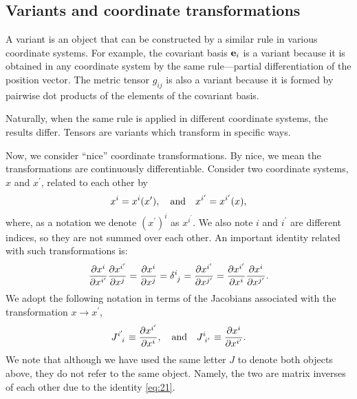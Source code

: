 \documentclass{article}
\begin{document}
	\subsection{Variants and coordinate transformations}
	A variant is an object that can be constructed by a similar rule in various coordinate systems. For example, the covariant basis $ \vb{e}_{i} $ is a variant because it is obtained in any coordinate system by the same rule—partial differentiation of the position vector. The metric tensor $ g_{ij} $ is also a variant because it is formed by pairwise dot products of the elements of the covariant basis.
	\par
	Naturally, when the same rule is applied in different coordinate systems, the results differ. Tensors are variants which transform in specific ways.
	\par
	Now, we consider ``nice'' coordinate transformations. By nice, we mean the transformations are continuously differentiable. Consider two coordinate systems, $ x $ and $ x^\prime $, related to each other by
	\[
	x^{i} = x^{i}(x^\prime), \qq{and} x^{i^\prime}= x^{i^\prime}(x),
	\]
	where, as a notation we denote $ (x^\prime)^{i} $ as $ x^{i^\prime} $. We also note $ i $ and $ i^\prime $ are different indices, so they are not summed over each other. An important identity related with such transformations is:
	\begin{equation} \label{eq:21}
	\pdv{x^{i}}{x^{i^\prime}}\pdv{x^{i^\prime}}{x^{j}} = \pdv{x^{i}}{x^{j}} = \delta\indices{^{i}_{j}} = \pdv{x^{i^\prime}}{x^{j^\prime}} = \pdv{x^{i^\prime}}{x^{i}}\pdv{x^{i}}{x^{j^\prime}}.
	\end{equation}
	We adopt the following notation in terms of the Jacobians associated with the transformation $ x \to x^\prime $,
	\begin{equation}
	J\indices{^{i^\prime}_{i}} \equiv \pdv{x^{i^\prime}}{x^{i}}, \qq{and} J\indices{^{i}_{i^\prime}} \equiv \pdv{x^{i}}{x^{i^\prime}}.
	\end{equation}
	We note that although we have used the same letter $ J $ to denote both objects above, they do not refer to the same object. Namely, the two are matrix inverses of each other due to the identity \eqref{eq:21}.
\end{document}
